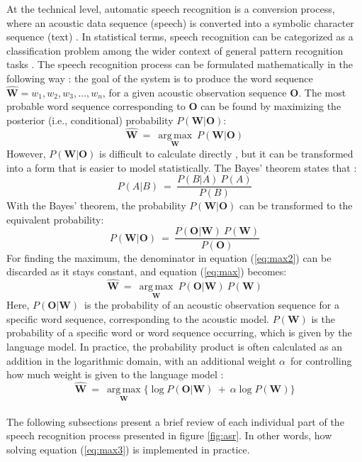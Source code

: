 \documentclass[english, 12pt, a4paper, pdftex, elec, utf8]{aaltothesis}
\DeclareMathOperator*{\argmax}{arg\,max}
\begin{document}
At the technical level, automatic speech recognition is a conversion process, where an acoustic data sequence (speech) is converted into a symbolic character sequence (text) \cite{yu2014automatic}. In statistical terms, speech recognition can be categorized as a classification problem among the wider context of general pattern recognition tasks \cite{huang2001spoken}. The speech recognition process can be formulated mathematically in the following way \cite{huang2001spoken, gales2008application, kallasjoki2016}: the goal of the system is to produce the word sequence $ \hat{\bm{W}} = w_1, w_2, w_3,\dots,w_n$, for a given acoustic observation sequence $\bm{O}$. The most probable word sequence corresponding to $\bm{O}$ can be found by maximizing the posterior (i.e., conditional) probability $P(\bm{W} | \bm{O})$:
\begin{equation} \label{eq:max}
\hat{\bm{W}} \ = \ \underset{\bm{W}}{\argmax} \ P(\bm{W} | \bm{O})
\end{equation}
However, $P(\bm{W} | \bm{O})$ is difficult to calculate directly \cite{gales2008application}, but it can be transformed into a form that is easier to model statistically. The Bayes' theorem states that \cite[p.~10]{hori2013speech}:
\begin{equation}
P(A | B) \ = \ \frac{P(B | A) \ P(A)}{P(B)}
\end{equation}
With the Bayes' theorem, the probability $P(\bm{W} | \bm{O})$ can be transformed to the equivalent probability:
\begin{equation} \label{eq:max2}
P(\bm{W} | \bm{O}) \ = \ \frac{P(\bm{O} | \bm{W}) \ P(\bm{W})}{P(\bm{O})}
\end{equation}
For finding the maximum, the denominator in equation (\ref{eq:max2}) can be discarded as it stays constant, and equation (\ref{eq:max}) becomes:
\begin{equation} \label{eq:max3}
\hat{\bm{W}} \ = \ \underset{\bm{W}}{\argmax} \ P(\bm{O} | \bm{W}) \ P(\bm{W})
\end{equation}
Here, $P(\bm{O} | \bm{W})$ is the probability of an acoustic observation sequence for a specific word sequence, corresponding to the acoustic model. $P(\bm{W})$ is the probability of a specific word or word sequence occurring, which is given by the language model. In practice, the probability product is often calculated as an addition in the logarithmic domain, with an additional weight $\alpha$ for controlling how much weight is given to the language model \cite[p.~200]{gales2008application}:
\begin{equation}
\hat{\bm{W}} \ = \ \underset{\bm{W}}{\argmax} \big\{ \log P(\bm{O} | \bm{W}) \ + \ \alpha \log P(\bm{W}) \big\}
\end{equation} \\
The following subsections present a brief review of each individual part of the speech recognition process presented in figure \ref{fig:asr}. In other words, how solving equation (\ref{eq:max3}) is implemented in practice.
\end{document}
